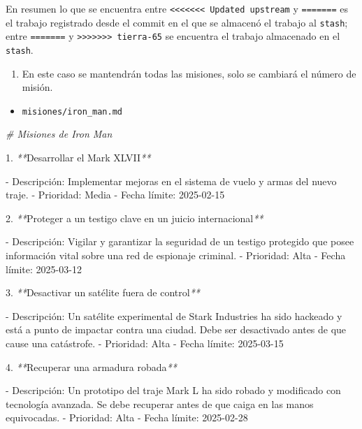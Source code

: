 \documentclass[
]{book}
\newenvironment{Shaded}{\begin{snugshade}}{\end{snugshade}}
\newcommand{\CommentTok}[1]{\textcolor[rgb]{0.56,0.35,0.01}{\textit{#1}}}
\newcommand{\ExtensionTok}[1]{#1}
\newcommand{\NormalTok}[1]{#1}
\newcommand{\PreprocessorTok}[1]{\textcolor[rgb]{0.56,0.35,0.01}{\textit{#1}}}
\providecommand{\tightlist}{%
  \setlength{\itemsep}{0pt}\setlength{\parskip}{0pt}}
\begin{document}
En resumen lo que se encuentra entre \texttt{\textless{}\textless{}\textless{}\textless{}\textless{}\textless{}\textless{}\ Updated\ upstream} y \texttt{=======} es el trabajo registrado desde el commit en el que se almacenó el trabajo al \texttt{stash}; entre \texttt{=======} y \texttt{\textgreater{}\textgreater{}\textgreater{}\textgreater{}\textgreater{}\textgreater{}\textgreater{}\ tierra-65} se encuentra el trabajo almacenado en el \texttt{stash}.

\begin{enumerate}
\def\labelenumi{\arabic{enumi}.}
\setcounter{enumi}{9}
\tightlist
\item
  En este caso se mantendrán todas las misiones, solo se cambiará el número de misión.
\end{enumerate}

\begin{itemize}
\tightlist
\item
  \texttt{misiones/iron\_man.md}
\end{itemize}

\begin{Shaded}
\begin{Highlighting}[]
\CommentTok{\# Misiones de Iron Man}

\ExtensionTok{1.} \PreprocessorTok{**}\NormalTok{Desarrollar el Mark XLVII}\PreprocessorTok{**}
   
   \ExtensionTok{{-}}\NormalTok{ Descripción: Implementar mejoras en el sistema de vuelo y armas del nuevo traje.}
   \ExtensionTok{{-}}\NormalTok{ Prioridad: Media}
   \ExtensionTok{{-}}\NormalTok{ Fecha límite: 2025{-}02{-}15}

\ExtensionTok{2.} \PreprocessorTok{**}\NormalTok{Proteger a un testigo clave en un juicio internacional}\PreprocessorTok{**}

   \ExtensionTok{{-}}\NormalTok{ Descripción: Vigilar y garantizar la seguridad de un testigo protegido que posee información vital sobre una red de espionaje criminal.}
   \ExtensionTok{{-}}\NormalTok{ Prioridad: Alta}
   \ExtensionTok{{-}}\NormalTok{ Fecha límite: 2025{-}03{-}12}

\ExtensionTok{3.} \PreprocessorTok{**}\NormalTok{Desactivar un satélite fuera de control}\PreprocessorTok{**}
   
   \ExtensionTok{{-}}\NormalTok{ Descripción: Un satélite experimental de Stark Industries ha sido hackeado y está a punto de impactar contra una ciudad. Debe ser desactivado antes de que cause una catástrofe.}
   \ExtensionTok{{-}}\NormalTok{ Prioridad: Alta}
   \ExtensionTok{{-}}\NormalTok{ Fecha límite: 2025{-}03{-}15}

\ExtensionTok{4.} \PreprocessorTok{**}\NormalTok{Recuperar una armadura robada}\PreprocessorTok{**}
   
   \ExtensionTok{{-}}\NormalTok{ Descripción: Un prototipo del traje Mark L ha sido robado y modificado con tecnología avanzada. Se debe recuperar antes de que caiga en las manos equivocadas.}
   \ExtensionTok{{-}}\NormalTok{ Prioridad: Alta}
   \ExtensionTok{{-}}\NormalTok{ Fecha límite: 2025{-}02{-}28}
\end{Highlighting}
\end{Shaded}
\end{document}
